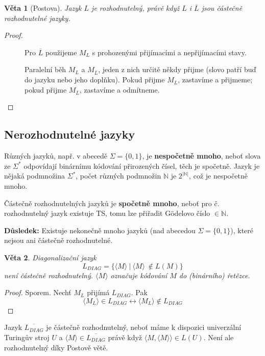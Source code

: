\documentclass[11pt]{report} %
\newcommand{\N}{\mathbb{N}}
\newtheorem{theorem}{Věta}[section]
\numberwithin{equation}{section}
\begin{document}
\begin{theorem}[Postova]
Jazyk $L$ je rozhodnutelný, právě když $L$ i $\overline{L}$ jsou částečně rozhodnutelné jazyky.
\end{theorem}
\begin{proof}~
	\begin{description}
		
		
		\item[\uv{$\Rightarrow$}] Pro $\overline{L}$ použijeme $M_L$ s prohozenými přijímacími a nepřijímacími stavy.
		\item[\uv{$\Leftarrow$}] Paralelní běh $M_L$ a $M_{\overline{L}}$, jeden z nich určitě někdy přijme (slovo patří buď do jazyku nebo jeho doplňku). Pokud přijme $M_L$, zastavíme a přijmeme; pokud přijme $M_{\overline{L}}$, zastavíme a odmítneme.
		
	\end{description}
\end{proof}

\subsection{Nerozhodnutelné jazyky}
Různých jazyků, např. v abecedě $\Sigma = \{0,1\}$, je \textbf{nespočetně mnoho}, neboť slova ze $\Sigma^*$ odpovídají binárnímu kódování přirozených čísel, těch je spočetně. Jazyk je nějaká podmnožina $\Sigma^*$, počet různých podmnožin $\N$ je $2^{|\N|}$, což je nespočetně mnoho.

Částečně rozhodnutelných jazyků je \textbf{spočetně mnoho}, neboť pro č. rozhodnutelný jazyk existuje TS, tomu lze přiřadit Gödelovo číslo $\in \N$. 

\textbf{Důsledek:} Existuje nekonečně mnoho jazyků (nad abecedou $\Sigma = \{0,1\}$), které nejsou ani částečně rozhodnutelné.

\begin{theorem}
Diagonalizační jazyk 
	$$L_{DIAG} = \{\langle M \rangle\ |\ \langle M \rangle\ \notin L(M)\}$$
není částečně rozhodnutelný. $\langle M \rangle$ označuje kódování $M$ do (binárního) řetězce.
\end{theorem}
\begin{proof}
Sporem. Nechť $M_L$ přijímá $L_{DIAG}$. Pak 
$$\langle M_L \rangle \in L_{DIAG} \leftrightarrow \langle M_L \rangle \notin L_{DIAG}$$
\end{proof}

Jazyk $\overline{L_{DIAG}}$ je částečně rozhodnutelný, neboť máme k dispozici univerzální Turingův stroj $U$ a $\langle M \rangle \in \overline{L_{DIAG}}$ právě když $\langle M, \langle M \rangle\rangle \in L(U)$. Není ale rozhodnutelný díky Postově větě.
\end{document}
